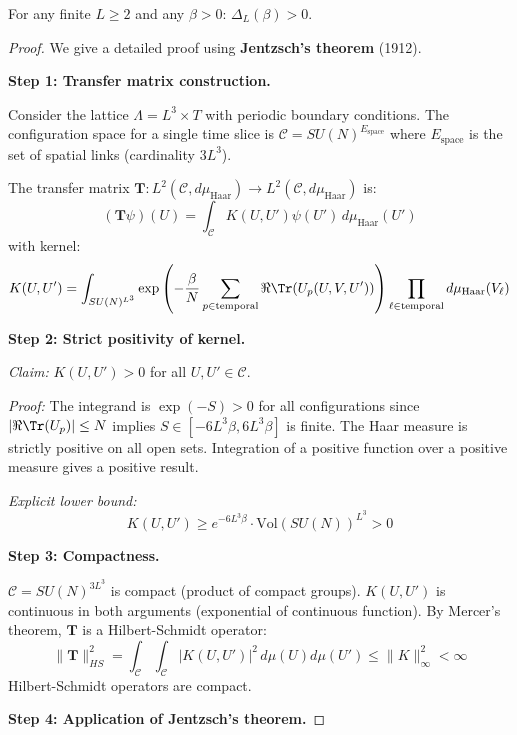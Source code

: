\begin{theorem}
\label{thm:finite-positive-complete}
\label{thm:bootstrap-rigorous}
For any finite $L \geq 2$ and any $\beta > 0$: $\Delta_L(\beta) > 0$.
\end{theorem}

\begin{proof}
We give a detailed proof using \textbf{Jentzsch's theorem} (1912).

\textbf{Step 1: Transfer matrix construction.}

Consider the lattice $\Lambda = L^3 \times T$ with periodic boundary conditions.
The configuration space for a single time slice is $\mathcal{C} = SU(N)^{E_{\text{space}}}$ 
where $E_{\text{space}}$ is the set of spatial links (cardinality $3L^3$).

The transfer matrix $\mathbf{T}: L^2(\mathcal{C}, d\mu_{\text{Haar}}) \to L^2(\mathcal{C}, d\mu_{\text{Haar}})$ is:
\[
(\mathbf{T}\psi)(U) = \int_{\mathcal{C}} K(U, U') \psi(U') \, d\mu_{\text{Haar}}(U')
\]
with kernel:
\[
K(U, U') = \int_{SU(N)^{L^3}} \exp\left(-\frac{\beta}{N} \sum_{p \in \text{temporal}} \Re\Tr(U_p(U, V, U'))\right) \prod_{\ell \in \text{temporal}} d\mu_{\text{Haar}}(V_\ell)
\]

\textbf{Step 2: Strict positivity of kernel.}

\textit{Claim:} $K(U, U') > 0$ for all $U, U' \in \mathcal{C}$.

\textit{Proof:} The integrand is $\exp(-S) > 0$ for all configurations since 
$|\Re\Tr(U_p)| \leq N$ implies $S \in [-6L^3\beta, 6L^3\beta]$ is finite.
The Haar measure is strictly positive on all open sets.
Integration of a positive function over a positive measure gives a positive result.

\textit{Explicit lower bound:} 
\[
K(U, U') \geq e^{-6L^3\beta} \cdot \text{Vol}(SU(N))^{L^3} > 0
\]

\textbf{Step 3: Compactness.}

$\mathcal{C} = SU(N)^{3L^3}$ is compact (product of compact groups).
$K(U, U')$ is continuous in both arguments (exponential of continuous function).
By Mercer's theorem, $\mathbf{T}$ is a Hilbert-Schmidt operator:
\[
\|\mathbf{T}\|_{HS}^2 = \int_{\mathcal{C}} \int_{\mathcal{C}} |K(U, U')|^2 \, d\mu(U) d\mu(U') 
\leq \|K\|_\infty^2 < \infty
\]
Hilbert-Schmidt operators are compact.

\textbf{Step 4: Application of Jentzsch's theorem.}


\end{proof}
